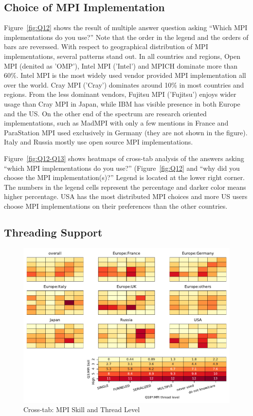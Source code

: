 \documentclass[sigconf,nonacm]{acmart}
\begin{document}
\subsection{Choice of MPI Implementation}

Figure~\ref{fig:Q12} shows the result of multiple answer question
asking ``Which MPI implementations do you use?'' Note that the order
in the legend and the orders of bars are reverssed. 
With respect to geographical distribution of MPI implementations,
several patterns stand out. In all countries and regions, Open MPI
(denited as 'OMP'),
Intel MPI ('Intel') and MPICH dominate more than 60\%. Intel MPI is
the most 
widely used vendor provided MPI implementation all over the
world. Cray MPI ('Cray') dominates around 10\% in most countries and
regions. From the less dominant vendors, Fujitsu MPI ('Fujitsu')
enjoys wider usage than Cray MPI in Japan, while IBM has visible
presence in both Europe and the US. 
On the other end of the spectrum are research oriented
implementations, such as MadMPI with only a few mentions in
France and ParaStation MPI used exclusively in
Germany (they are not shown in the figure). Italy and Russia mostly
use open source MPI implementations.

Figure~\ref{fig:Q12-Q13} shows heatmaps of cross-tab analysis of the
answers asking ``which MPI implementations do you use?''
(Figure~\ref{fig:Q12} and ``why did you choose the MPI
implementation(s)?'' Legend is located at the lower right
corner. The numbers in the legend cells represent the
percentage and darker color means higher percentage. USA has the most
distributed MPI choices and more US users choose MPI implementations
on their preferences than the other countries.
  
\subsection{Threading Support}

\begin{figure}[htb]
\begin{center}
\includegraphics[width=0.8\hsize]{figs/Q3-Q18.pdf}
\caption{Cross-tab: MPI Skill and Thread Level}%
\label{fig:Q3-Q18}
\end{center}
\end{figure}
\end{document}
